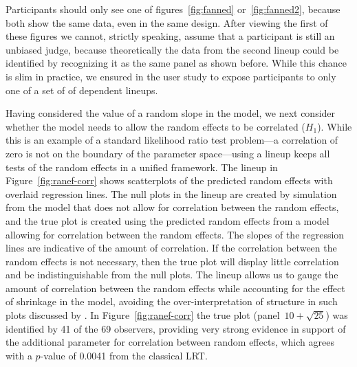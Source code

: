 \documentclass[12pt]{article} %
\newcommand{\hh}[1]{{\color{orange} #1}}
\newcommand{\alnote}[1]{\todo[inline,color=green!40]{#1}} %
\newcommand{\hhnote}[1]{\todo[inline,color=orange!40]{#1}}
\begin{document}

\hh{Participants should only see one of figures~\ref{fig:fanned} or~\ref{fig:fanned2}, because both show the same data, even in the same design. After viewing the first of these figures we cannot, strictly speaking, assume that a participant is still an unbiased judge, because theoretically the data from the  second lineup could be identified by recognizing it as the same panel as shown before. While this chance is slim in practice, we ensured in the user study to expose participants to only one of a set of of dependent lineups.  }

Having considered the value of a random slope in the model, we next consider whether the model needs to allow the random effects to be correlated ($H_1$). While this is an example of a standard likelihood ratio test problem---a correlation of zero is not on the boundary of the parameter space---using a lineup keeps all tests of the random effects in a unified framework. The lineup in Figure~\ref{fig:ranef-corr} shows scatterplots of the predicted random effects with overlaid regression lines. 
 The null plots in the lineup are created by simulation from the model that does not allow for correlation between the random effects, and the true plot is created using the predicted random effects from a model allowing for correlation between the random effects.
The slopes of the regression lines are indicative of the amount of correlation. 
 If the correlation between the random effects is not necessary, then the true plot will display little correlation and be indistinguishable from the null plots.
The lineup allows us to gauge the amount of correlation between the random effects while accounting for the effect of shrinkage in the model, avoiding the over-interpretation of structure in such plots discussed by \cite{Morrell:2000ve}.
  In Figure~\ref{fig:ranef-corr} the true plot (panel~$10 + \sqrt{25}$) was identified by 41 of the 69 observers, providing very strong evidence in  support of  the additional parameter for correlation between random effects, which agrees with a $p$-value of 0.0041 from the classical LRT.
\end{document}
